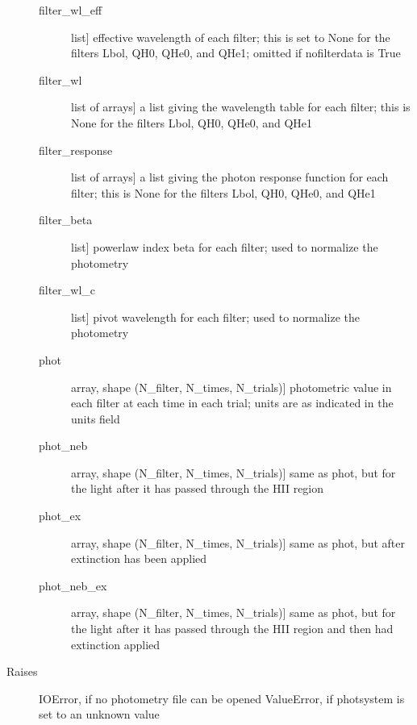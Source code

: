 \documentclass[letterpaper,10pt,english]{sphinxmanual}
\begin{document}
\begin{fulllineitems}
\begin{description}
\begin{description}
\item[{filter\_wl\_eff}] \leavevmode{[}list{]}
effective wavelength of each filter; this is set to None for the
filters Lbol, QH0, QHe0, and QHe1; omitted if nofilterdata is
True

\item[{filter\_wl}] \leavevmode{[}list of arrays{]}
a list giving the wavelength table for each filter; this is
None for the filters Lbol, QH0, QHe0, and QHe1

\item[{filter\_response}] \leavevmode{[}list of arrays{]}
a list giving the photon response function for each filter;
this is None for the filters Lbol, QH0, QHe0, and QHe1

\item[{filter\_beta}] \leavevmode{[}list{]}
powerlaw index beta for each filter; used to normalize the
photometry

\item[{filter\_wl\_c}] \leavevmode{[}list{]}
pivot wavelength for each filter; used to normalize the photometry

\item[{phot}] \leavevmode{[}array, shape (N\_filter, N\_times, N\_trials){]}
photometric value in each filter at each time in each trial;
units are as indicated in the units field

\item[{phot\_neb}] \leavevmode{[}array, shape (N\_filter, N\_times, N\_trials){]}
same as phot, but for the light after it has passed through
the HII region

\item[{phot\_ex}] \leavevmode{[}array, shape (N\_filter, N\_times, N\_trials){]}
same as phot, but after extinction has been applied

\item[{phot\_neb\_ex}] \leavevmode{[}array, shape (N\_filter, N\_times, N\_trials){]}
same as phot, but for the light after it has passed through
the HII region and then had extinction applied

\end{description}

\item[{Raises}] \leavevmode
IOError, if no photometry file can be opened
ValueError, if photsystem is set to an unknown value

\end{description}

\end{fulllineitems}
\end{document}

